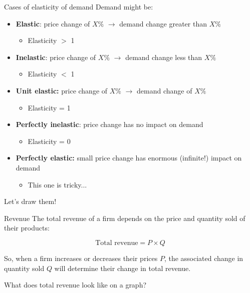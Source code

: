 \documentclass[compress]{beamer}
\begin{document}
\begin{frame}{Cases of elasticity of demand}
Demand might be:
    \begin{itemize}
     \item \textbf{Elastic}: price change of $X\%$ $\to$ demand change greater than $X\%$ 
     \begin{itemize}
         \item Elasticity $>$ 1
     \end{itemize}
     \item \textbf{Inelastic}: price change of $X\%$ $\to$ demand change less than $X\%$ 
     \begin{itemize}
         \item Elasticity $<$ 1
     \end{itemize}
     \item \textbf{Unit elastic:} price change of $X\%$ $\to$ demand change of $X\%$
     \begin{itemize}
         \item Elasticity = 1
     \end{itemize}
     \item \textbf{Perfectly inelastic}: price change has no impact on demand
     \begin{itemize}
         \item Elasticity = 0
     \end{itemize}
     \item \textbf{Perfectly elastic:} small price change has enormous (infinite!) impact on demand
     \begin{itemize}
         \item This one is tricky...
     \end{itemize}
    \end{itemize}

\medskip
    \begin{center}
        Let's draw them!
    \end{center}
\end{frame}

\begin{frame}{Revenue}
The total revenue of a firm depends on the price and quantity sold of their products:

\[\text{Total revenue} = P \times Q\]

So, when a firm increases or decreases their prices $P$, the associated change in quantity sold $Q$ will determine their change in total revenue. \\

\medskip

What does total revenue look like on a graph?
    
\end{frame}
\end{document}
